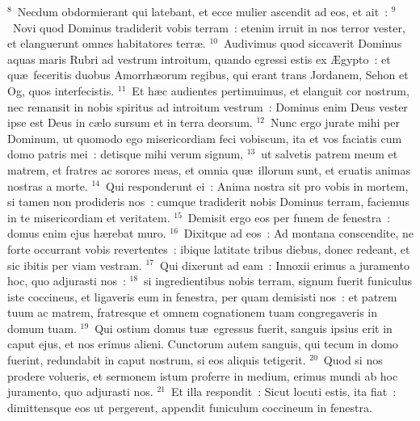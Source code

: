 ${}^{8}$~Necdum obdormierant qui latebant, et ecce mulier ascendit ad eos, et ait~:
${}^{9}$~Novi quod Dominus tradiderit vobis terram~: etenim irruit in nos terror vester, et elanguerunt omnes habitatores terr\ae .
${}^{10}$~Audivimus quod siccaverit Dominus aquas maris Rubri ad vestrum introitum, quando egressi estis ex \AE gypto~: et qu\ae\ feceritis duobus Amorrh\ae orum regibus, qui erant trans Jordanem, Sehon et Og, quos interfecistis.
${}^{11}$~Et h\ae c audientes pertimuimus, et elanguit cor nostrum, nec remansit in nobis spiritus ad introitum vestrum~: Dominus enim Deus vester ipse est Deus in c\ae lo sursum et in terra deorsum.
${}^{12}$~Nunc ergo jurate mihi per Dominum, ut quomodo ego misericordiam feci vobiscum, ita et vos faciatis cum domo patris mei~: detisque mihi verum signum,
${}^{13}$~ut salvetis patrem meum et matrem, et fratres ac sorores meas, et omnia qu\ae\ illorum sunt, et eruatis animas nostras a morte.
${}^{14}$~Qui responderunt ei~: Anima nostra sit pro vobis in mortem, si tamen non prodideris nos~: cumque tradiderit nobis Dominus terram, faciemus in te misericordiam et veritatem.
${}^{15}$~Demisit ergo eos per funem de fenestra~: domus enim ejus h\ae rebat muro.
${}^{16}$~Dixitque ad eos~: Ad montana conscendite, ne forte occurrant vobis revertentes~: ibique latitate tribus diebus, donec redeant, et sic ibitis per viam vestram.
${}^{17}$~Qui dixerunt ad eam~: Innoxii erimus a juramento hoc, quo adjurasti nos~:
${}^{18}$~si ingredientibus nobis terram, signum fuerit funiculus iste coccineus, et ligaveris eum in fenestra, per quam demisisti nos~: et patrem tuum ac matrem, fratresque et omnem cognationem tuam congregaveris in domum tuam.
${}^{19}$~Qui ostium domus tu\ae\ egressus fuerit, sanguis ipsius erit in caput ejus, et nos erimus alieni. Cunctorum autem sanguis, qui tecum in domo fuerint, redundabit in caput nostrum, si eos aliquis tetigerit.
${}^{20}$~Quod si nos prodere volueris, et sermonem istum proferre in medium, erimus mundi ab hoc juramento, quo adjurasti nos.
${}^{21}$~Et illa respondit~: Sicut locuti estis, ita fiat~: dimittensque eos ut pergerent, appendit funiculum coccineum in fenestra.


